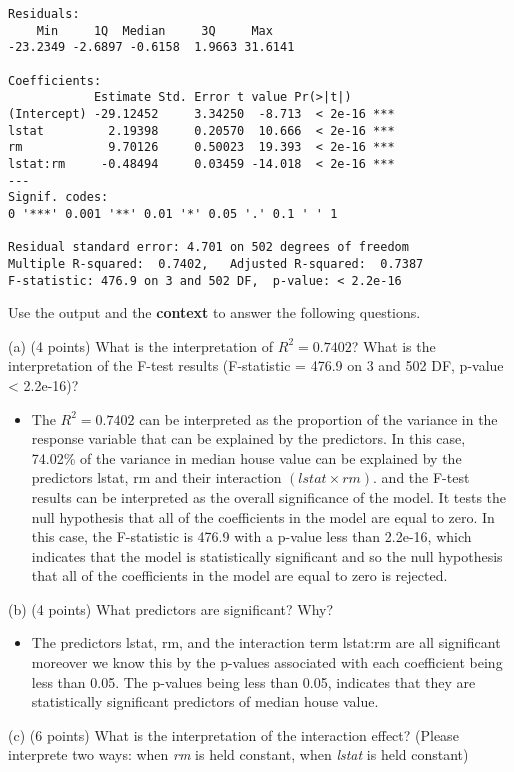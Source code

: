 \documentclass[
]{article}
\begin{document}
\begin{enumerate}
\begin{verbatim}
Residuals:
    Min     1Q  Median     3Q     Max 
-23.2349 -2.6897 -0.6158  1.9663 31.6141 

Coefficients:
            Estimate Std. Error t value Pr(>|t|)    
(Intercept) -29.12452     3.34250  -8.713  < 2e-16 ***
lstat         2.19398     0.20570  10.666  < 2e-16 ***
rm            9.70126     0.50023  19.393  < 2e-16 ***
lstat:rm     -0.48494     0.03459 -14.018  < 2e-16 ***
---
Signif. codes:
0 '***' 0.001 '**' 0.01 '*' 0.05 '.' 0.1 ' ' 1

Residual standard error: 4.701 on 502 degrees of freedom
Multiple R-squared:  0.7402,   Adjusted R-squared:  0.7387 
F-statistic: 476.9 on 3 and 502 DF,  p-value: < 2.2e-16
\end{verbatim}
Use the output and the \textbf{context} to answer the following questions.

(a) (4 points) What is the interpretation of $R^2 = 0.7402$? What is the interpretation of the F-test results (F-statistic = 476.9 on 3 and 502 DF, p-value < 2.2e-16)?

\begin{itemize}
\item The $R^2 = 0.7402$ can be interpreted as the proportion of the variance in the response variable that can be explained by the predictors. In this case, 74.02\% of the variance in median house value can be explained by the predictors lstat, rm and their interaction $(lstat \times rm)$. and the F-test results can be interpreted as the overall significance of the model. It tests the null hypothesis that all of the coefficients in the model are equal to zero. In this case, the F-statistic is 476.9 with a p-value less than 2.2e-16, which indicates that the model is statistically significant and so the null hypothesis that all of the coefficients in the model are equal to zero is rejected.
\end{itemize}
(b) (4 points) What predictors are significant? Why?

\begin{itemize}
\item The predictors lstat, rm, and the interaction term lstat:rm are all significant moreover we know this by the p-values associated with each coefficient being less than 0.05. The p-values being less than 0.05, indicates that they are statistically significant predictors of median house value.
\end{itemize}
(c) (6 points) What is the interpretation of the interaction effect? (Please interprete two ways: when \textit{rm} is held constant, when \textit{lstat} is held constant)


\end{enumerate}
\end{document}
